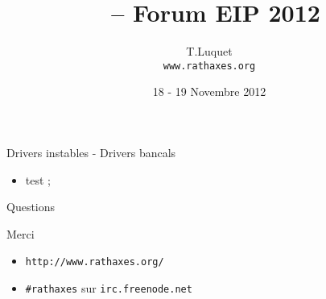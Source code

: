 \documentclass[xcolor={usenames,svgnames}]{beamer}
\title{\rtx\ -- Forum EIP 2012}
\date{18 - 19 Novembre 2012}
\author{T.Luquet \\ \texttt{www.rathaxes.org}}
\newcommand{\cemph}[1]{{\itshape{\textcolor{rathaxesred}{#1}}}}
\newcommand{\tred}[1]{\textcolor{rathaxesred}{#1}}
\begin{document}
\begin{frame}
\titlepage
\end{frame}

\begin{frame}{Drivers instables - Drivers bancals}
  \begin{itemize}
    \item test ;

  \end{itemize}
\end{frame}







\begin{frame}{Questions}
\begin{center}
\Huge{Merci}
\end{center}
\vspace{2em}
\begin{itemize}
\item \Large{\texttt{http://www.rathaxes.org/}}
\item \Large{\texttt{\#rathaxes} sur \texttt{irc.freenode.net}}
\end{itemize}
\end{frame}
\end{document}
